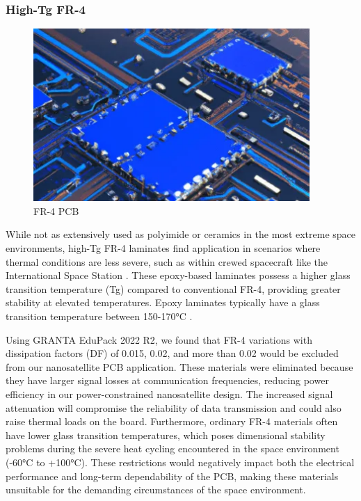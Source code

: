 \subsubsection{High-Tg FR-4}
\begin{figure}[htbp]
    \centering
    \includegraphics[width=10.5cm]{chapters/methodology/MaterialAnalysis/Fig1FRPCB.png}
    \caption{FR-4 PCB \cite{86PCB2024}}
    \label{fig:fr4-pcb}
\end{figure}

While not as extensively used as polyimide or ceramics in the most extreme space environments, high-Tg FR-4 laminates find application in scenarios where thermal conditions are less severe, such as within crewed spacecraft like the International Space Station \cite{CadenceDesignSystems2025}. 
These epoxy-based laminates possess a higher glass transition temperature (Tg) compared to conventional FR-4, providing greater stability at elevated temperatures.
Epoxy laminates typically have a glass transition temperature between 150-170°C \cite{CadenceDesignSystems2025}.

Using GRANTA EduPack 2022 R2, we found that FR-4 variations with dissipation factors (DF) of 0.015, 0.02, and more than 0.02 would be excluded from our nanosatellite PCB application. 
These materials were eliminated because they have larger signal losses at communication frequencies, reducing power efficiency in our power-constrained nanosatellite design.
The increased signal attenuation will compromise the reliability of data transmission and could also raise thermal loads on the board. Furthermore, ordinary FR-4 materials often have lower glass transition temperatures, which poses dimensional stability problems during the severe heat cycling encountered in the space environment (-60°C to +100°C). 
These restrictions would negatively impact both the electrical performance and long-term dependability of the PCB, making these materials unsuitable for the demanding circumstances of the space environment.


